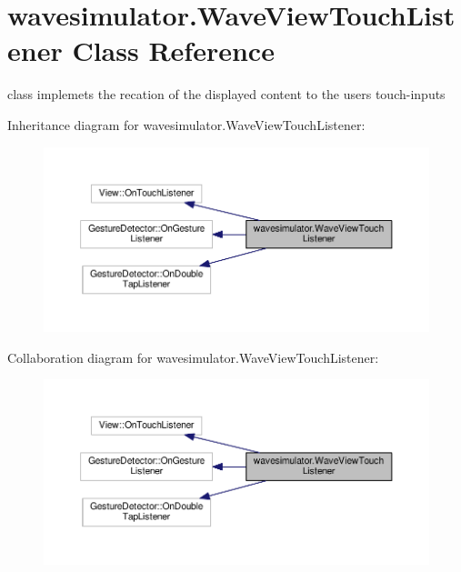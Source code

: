 \hypertarget{classwavesimulator_1_1WaveViewTouchListener}{}\section{wavesimulator.\+Wave\+View\+Touch\+Listener Class Reference}
\label{classwavesimulator_1_1WaveViewTouchListener}


class implemets the recation of the displayed content to the users touch-\/inputs  




Inheritance diagram for wavesimulator.\+Wave\+View\+Touch\+Listener\+:\nopagebreak
\begin{figure}[H]
\begin{center}
\leavevmode
\includegraphics[width=350pt]{classwavesimulator_1_1WaveViewTouchListener__inherit__graph}
\end{center}
\end{figure}


Collaboration diagram for wavesimulator.\+Wave\+View\+Touch\+Listener\+:\nopagebreak
\begin{figure}[H]
\begin{center}
\leavevmode
\includegraphics[width=350pt]{classwavesimulator_1_1WaveViewTouchListener__coll__graph}
\end{center}
\end{figure}
